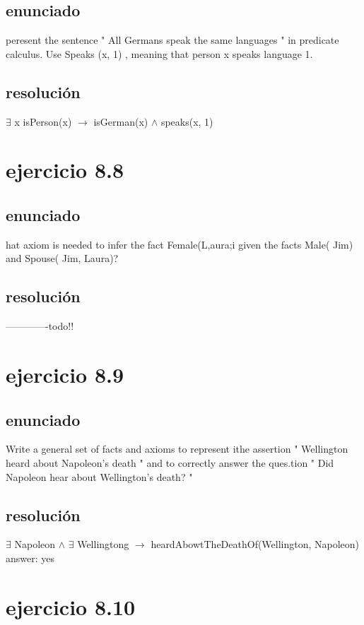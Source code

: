 \documentclass[a4paper,10pt]{article}
\newcommand\tab[1][1cm]{\hspace*{#1}}
\begin{document}
\subsection{enunciado}
peresent the sentence " All Germans speak the same languages " in predicate calculus. Use Speaks (x, 1) , meaning that person x speaks language 1.
\subsection{resolución}
$\exists$ x isPerson(x) $\rightarrow$ isGerman(x) $\land$ speaks(x, 1)

\section{ejercicio 8.8}
\subsection{enunciado}
hat axiom is needed to infer the fact Female(L,aura;i given the facts Male( Jim) and Spouse( Jim, Laura)?
\subsection{resolución}
-------------todo!!

\section{ejercicio 8.9}
\subsection{enunciado}
Write a  general  set of facts  and  axioms to represent ithe assertion " Wellington heard about  Napoleon's  death " and  to  correctly  answer  the ques.tion " Did Napoleon  hear  about Wellington's death? "
\subsection{resolución}
$\exists$ Napoleon $\land$ $\exists$ Wellingtong $\rightarrow$ heardAbowtTheDeathOf(Wellington, Napoleon)
\\\tab answer: yes

\pagebreak

\section{ejercicio 8.10}
\end{document}
